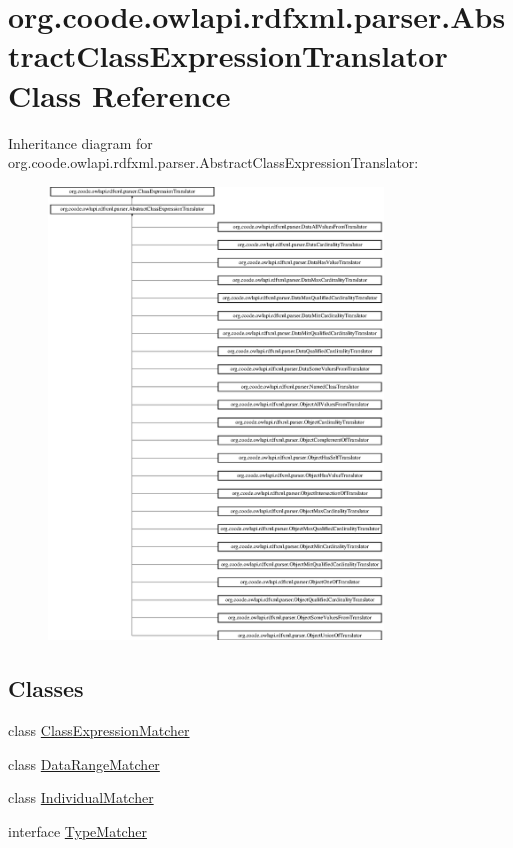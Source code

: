 \hypertarget{classorg_1_1coode_1_1owlapi_1_1rdfxml_1_1parser_1_1_abstract_class_expression_translator}{\section{org.\-coode.\-owlapi.\-rdfxml.\-parser.\-Abstract\-Class\-Expression\-Translator Class Reference}
\label{classorg_1_1coode_1_1owlapi_1_1rdfxml_1_1parser_1_1_abstract_class_expression_translator}
}
Inheritance diagram for org.\-coode.\-owlapi.\-rdfxml.\-parser.\-Abstract\-Class\-Expression\-Translator\-:\begin{figure}[H]
\begin{center}
\leavevmode
\includegraphics[height=12.000000cm]{classorg_1_1coode_1_1owlapi_1_1rdfxml_1_1parser_1_1_abstract_class_expression_translator}
\end{center}
\end{figure}
\subsection*{Classes}
\begin{DoxyCompactItemize}
\item 
class \hyperlink{classorg_1_1coode_1_1owlapi_1_1rdfxml_1_1parser_1_1_abstract_class_expression_translator_1_1_class_expression_matcher}{Class\-Expression\-Matcher}
\item 
class \hyperlink{classorg_1_1coode_1_1owlapi_1_1rdfxml_1_1parser_1_1_abstract_class_expression_translator_1_1_data_range_matcher}{Data\-Range\-Matcher}
\item 
class \hyperlink{classorg_1_1coode_1_1owlapi_1_1rdfxml_1_1parser_1_1_abstract_class_expression_translator_1_1_individual_matcher}{Individual\-Matcher}
\item 
interface \hyperlink{interfaceorg_1_1coode_1_1owlapi_1_1rdfxml_1_1parser_1_1_abstract_class_expression_translator_1_1_type_matcher}{Type\-Matcher}
\end{DoxyCompactItemize}
